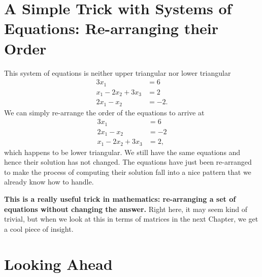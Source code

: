  
 \section{A Simple Trick with Systems of Equations: Re-arranging their Order}
 \label{sec:SwappingRows}
 
This system of equations is neither upper triangular nor lower triangular
\begin{equation}
\label{eq:BeforeSwapping0}
    \begin{aligned}
     3 x_1 &=6 \\
    x_1 - 2 x_2 + 3 x_3  &= 2 \\
         2 x_1 - x_2 &= -2.
    \end{aligned}
\end{equation}
We can simply re-arrange the order of the equations to arrive at
\begin{equation}
\label{eq:AfterSwapping0}
    \begin{aligned}
     3 x_1 &=6 \\
         2 x_1 - x_2 &= -2 \\
             x_1 - 2 x_2 + 3 x_3  &= 2 ,
    \end{aligned}
\end{equation}
which happens to be lower triangular. We still have the same equations and hence their solution has not changed. The equations have just been re-arranged to make the process of computing their solution fall into a nice pattern that we already know how to handle.
\begin{tcolorbox}
\textbf{This is a really useful trick in mathematics: re-arranging a set of equations without changing the answer.} Right here, it may seem kind of trivial, but when we look at this in terms of matrices in the next Chapter, we get a cool piece of insight. 
\end{tcolorbox}




\section{Looking Ahead}

